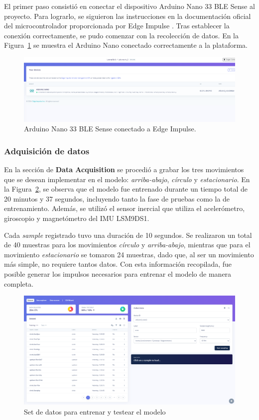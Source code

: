 \documentclass[12pt,a4paper]{article}
\begin{document}
El primer paso consistió en conectar el dispositivo Arduino Nano 33 BLE Sense al proyecto. Para lograrlo, se siguieron las instrucciones en la documentación oficial del microcontrolador proporcionada por Edge Impulse \cite{edgeardu}. Tras establecer la conexión correctamente, se pudo comenzar con la recolección de datos. En la Figura~\ref{fig:6} se muestra el Arduino Nano conectado correctamente a la plataforma.  

\begin{figure}[H]
    \centering
    \includegraphics[width=0.8\linewidth]{Imagenes/device.png}
    \caption{Arduino Nano 33 BLE Sense conectado a Edge Impulse.}
    \label{fig:6}
\end{figure}


\subsubsection{Adquisición de datos}
En la sección de \textbf{Data Acquisition} se procedió a grabar los tres movimientos que se desean implementar en el modelo: \textit{arriba-abajo}, \textit{círculo} y \textit{estacionario}. En la Figura~\ref{fig:7}, se observa que el modelo fue entrenado durante un tiempo total de 20 minutos y 37 segundos, incluyendo tanto la fase de pruebas como la de entrenamiento. Además, se utilizó el sensor inercial que utiliza el acelerómetro, giroscopio y magnetómetro del IMU LSM9DS1.

Cada \textit{sample} registrado tuvo una duración de 10 segundos. Se realizaron un total de 40 muestras para los movimientos \textit{círculo} y \textit{arriba-abajo}, mientras que para el movimiento \textit{estacionario} se tomaron 24 muestras, dado que, al ser un movimiento más simple, no requiere tantos datos. Con esta información recopilada, fue posible generar los impulsos necesarios para entrenar el modelo de manera completa.

\begin{figure}[H]
    \centering
    \includegraphics[width=0.8\linewidth]{Imagenes/dataset.png}
    \caption{Set de datos para entrenar y testear el modelo}
    \label{fig:7}
\end{figure}
\end{document}
